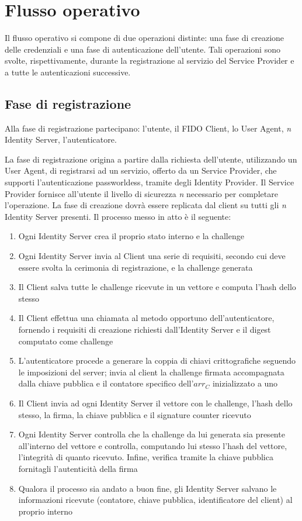 \section{Flusso operativo}
\label{flusso_operativo}

Il flusso operativo si compone di due operazioni distinte: una fase di creazione delle credenziali e una fase di autenticazione dell'utente. Tali operazioni sono svolte, rispettivamente, durante la registrazione al servizio del Service Provider e a tutte le autenticazioni successive.

\subsection{Fase di registrazione}
\label{registrazione}

Alla fase di registrazione partecipano: l'utente, il FIDO Client, lo User Agent, \emph{n} Identity Server, l'autenticatore.

La fase di registrazione origina a partire dalla richiesta dell'utente, utilizzando un User Agent, di registrarsi ad un servizio, offerto da un Service Provider, che supporti l'autenticazione passworldess, tramite degli Identity Provider. Il Service Provider fornisce all'utente il livello di sicurezza \emph{n} necessario per completare l'operazione. La fase di creazione dovrà essere replicata dal client su tutti gli \emph{n} Identity Server presenti.  Il processo messo in atto è il seguente:

\begin{enumerate}
	\item Ogni Identity Server crea il proprio stato interno e la challenge
	\item Ogni Identity Server invia al Client una serie di requisiti, secondo cui deve essere svolta la cerimonia di registrazione, e la challenge generata
	\item Il Client salva tutte le challenge ricevute in un vettore e computa l'hash dello stesso
	\item Il Client effettua una chiamata al metodo opportuno dell'autenticatore, fornendo i requisiti di creazione richiesti dall'Identity Server e il digest computato come challenge
	\item L'autenticatore procede a generare la coppia di chiavi crittografiche seguendo le imposizioni del server; invia al client la challenge firmata accompagnata dalla chiave pubblica e il contatore specifico dell'${arr_C}$ inizializzato a uno
	\item Il Client invia ad ogni Identity Server il vettore con le challenge, l'hash dello stesso, la firma, la chiave pubblica e il signature counter ricevuto
	\item Ogni Identity Server controlla che la challenge da lui generata sia presente all'interno del vettore e controlla, computando lui stesso l'hash del vettore, l'integrità di quanto ricevuto. Infine, verifica tramite la chiave pubblica fornitagli l'autenticità della firma
	\item Qualora il processo sia andato a buon fine, gli Identity Server salvano le informazioni ricevute (contatore, chiave pubblica, identificatore del client) al proprio interno
\end{enumerate} 

